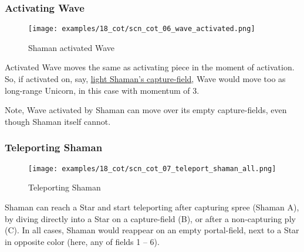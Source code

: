 \clearpage %

\subsubsection*{Activating Wave}
\label{sec:Conquest of Tlalocan/Shaman/Movement/Activating Wave}

\vspace*{-1.4\baselineskip}
\noindent
\begin{figure}[!h]
\texttt{[image: examples/18\_cot/scn\_cot\_06\_wave\_activated.png]}
\caption{Shaman activated Wave}
\label{fig:scn_cot_06_wave_activated}
\end{figure}

Activated Wave moves the same as activating piece in the moment of activation.
So, if activated on, say,
\hyperref[fig:scn_cot_03_light_shaman_capture_ply]{light Shaman's capture-field},
Wave would move too as long-range Unicorn, in this case with momentum of 3.

Note, Wave activated by Shaman can move over its empty capture-fields, even though
Shaman itself cannot.

\clearpage %

\subsubsection*{Teleporting Shaman}
\label{sec:Conquest of Tlalocan/Shaman/Movement/Teleporting Shaman}

\vspace*{-1.4\baselineskip}
\noindent
\begin{figure}[!h]
\texttt{[image: examples/18\_cot/scn\_cot\_07\_teleport\_shaman\_all.png]}
\caption{Teleporting Shaman}
\label{fig:scn_cot_07_teleport_shaman_all}
\end{figure}

Shaman can reach a Star and start teleporting after capturing spree (Shaman A),
by diving directly into a Star on a capture-field (B), or after a non-capturing
ply (C). In all cases, Shaman would reappear on an empty portal-field, next to a
Star in opposite color (here, any of fields 1 -- 6).

\clearpage %

